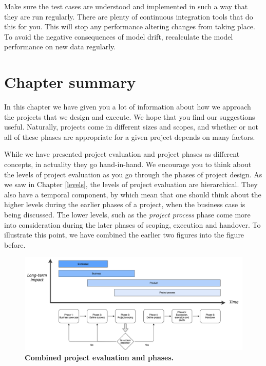 \documentclass[
]{book}
\begin{document}
Make sure the test cases are understood and implemented in such a way that they are run regularly. There are plenty of continuous integration tools that do this for you. This will stop any performance altering changes from taking place. To avoid the negative consequences of model drift, recalculate the model performance on new data regularly.

\hypertarget{chapter-summary}{%
\section{Chapter summary}\label{chapter-summary}}

In this chapter we have given you a lot of information about how we approach the projects that we design and execute. We hope that you find our suggestions useful. Naturally, projects come in different sizes and scopes, and whether or not all of these phases are appropriate for a given project depends on many factors.

While we have presented project evaluation and project phases as different concepts, in actuality they go hand-in-hand. We encourage you to think about the levels of project evaluation as you go through the phases of project design. As we saw in Chapter \ref{levels}, the levels of project evaluation are hierarchical. They also have a temporal component, by which mean that one should think about the higher levels during the earlier phases of a project, when the business case is being discussed. The lower levels, such as the \emph{project process} phase come more into consideration during the later phases of scoping, execution and handover. To illustrate this point, we have combined the earlier two figures into the figure before.

\begin{figure}
\includegraphics[width=1\linewidth]{figures/Framework phases} \caption{\textbf{Combined project evaluation and phases.}}\label{fig:full-figure}
\end{figure}
\end{document}
